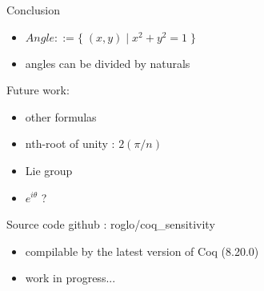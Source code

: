 \documentclass{beamer}
\begin{document}
\begin{frame}{Conclusion}
    \begin{itemize}
    \item $Angle ::= \{ \; (x, y) \; | \; x^2+y^2=1 \; \}$
    \item angles can be divided by naturals
    \end{itemize}
    \vspace{3mm}
    Future work:
    \begin{itemize}
    \item other formulas
    \item nth-root of unity : $2(\pi / n)$
    \item Lie group
    \item $e^{i \theta}$ ?
    \end{itemize}
\end{frame}

\begin{frame}{Source code}
  github : roglo/coq\_sensitivity \\
  \begin{itemize}
  \item compilable by the latest version of Coq (8.20.0)
  \item work in progress...
  \end{itemize}
\end{frame}
\end{document}
